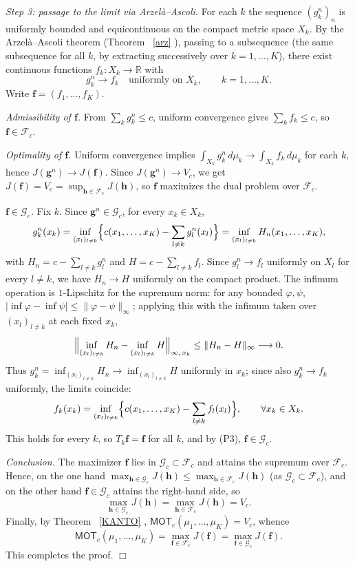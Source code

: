 \documentclass[twoside,11pt,a4paper]{article}
\newcommand*{\SavedRef}{}
\let\SavedRef\ref
\renewcommand*{\ref}[1]{  \begingroup
    \hypersetup{
      linkcolor=linkequation,
      linkbordercolor=linkequation,
    }    \SavedRef{#1}  \endgroup
}
\begin{document}
\medskip
\noindent\emph{Step 3: passage to the limit via Arzelà--Ascoli.}
For each $k$ the sequence $(g_k^n)_{n}$ is uniformly bounded and equicontinuous on
the compact metric space $X_k$. By the Arzelà--Ascoli theorem
(Theorem~\ref{arz}), passing to a subsequence (the same subsequence for all $k$,
by extracting successively over $k=1,\dots,K$), there exist continuous functions
$f_k:X_k\to\mathbb R$ with
\[
g_k^n\longrightarrow f_k\quad\text{uniformly on }X_k,\qquad k=1,\dots,K.
\]
Write $\boldsymbol f=(f_1,\dots,f_K)$.

\emph{Admissibility of $\boldsymbol f$.} From $\sum_k g_k^n\le c$, uniform
convergence gives $\sum_k f_k\le c$, so $\boldsymbol f\in\mathcal F_c$.

\emph{Optimality of $\boldsymbol f$.} Uniform convergence implies
$\int_{X_k}g_k^n\,d\mu_k\to\int_{X_k}f_k\,d\mu_k$ for each $k$, hence
$J(\boldsymbol g^n)\to J(\boldsymbol f)$. Since $J(\boldsymbol g^n)\to V_c$, we get
$J(\boldsymbol f)=V_c=\sup_{\boldsymbol h\in\mathcal F_c}J(\boldsymbol h)$, so
$\boldsymbol f$ maximizes the dual problem over $\mathcal F_c$.

\emph{$\boldsymbol f\in\mathcal G_c$.} Fix $k$. Since
$\boldsymbol g^n\in\mathcal G_c$, for every $x_k\in X_k$,
\[
g_k^n(x_k)=\inf_{(x_l)_{l\ne k}}\Bigl\{c(x_1,\dots,x_K)-\sum_{l\ne k}g_l^n(x_l)\Bigr\}
=\inf_{(x_l)_{l\ne k}}H_n(x_1,\dots,x_K),
\]
with $H_n=c-\sum_{l\ne k}g_l^n$ and $H=c-\sum_{l\ne k}f_l$. Since $g_l^n\to f_l$
uniformly on $X_l$ for every $l\ne k$, we have $H_n\to H$ uniformly on the compact
product. The infimum operation is $1$-Lipschitz for the supremum norm: for any
bounded $\varphi,\psi$,
$|\inf\varphi-\inf\psi|\le\|\varphi-\psi\|_\infty$; applying this with the infimum
taken over $(x_l)_{l\ne k}$ at each fixed $x_k$,
\[
\Bigl\|\inf_{(x_l)_{l\ne k}}H_n-\inf_{(x_l)_{l\ne k}}H\Bigr\|_{\infty,\,x_k}
\le\|H_n-H\|_\infty\longrightarrow0.
\]
Thus $g_k^n=\inf_{(x_l)_{l\ne k}}H_n\to\inf_{(x_l)_{l\ne k}}H$ uniformly in $x_k$;
since also $g_k^n\to f_k$ uniformly, the limits coincide:
\[
f_k(x_k)=\inf_{(x_l)_{l\ne k}}\Bigl\{c(x_1,\dots,x_K)-\sum_{l\ne k}f_l(x_l)\Bigr\},
\qquad\forall x_k\in X_k.
\]
This holds for every $k$, so $T_k\boldsymbol f=\boldsymbol f$ for all $k$, and by
(P3), $\boldsymbol f\in\mathcal G_c$.

\medskip
\noindent\emph{Conclusion.}
The maximizer $\boldsymbol f$ lies in $\mathcal G_c\subset\mathcal F_c$ and attains
the supremum over $\mathcal F_c$. Hence, on the one hand
$\max_{\boldsymbol h\in\mathcal G_c}J(\boldsymbol h)\le
\max_{\boldsymbol h\in\mathcal F_c}J(\boldsymbol h)$ (as $\mathcal G_c\subset\mathcal F_c$),
and on the other hand $\boldsymbol f\in\mathcal G_c$ attains the right-hand side, so
\[
\max_{\boldsymbol h\in\mathcal G_c}J(\boldsymbol h)
=\max_{\boldsymbol h\in\mathcal F_c}J(\boldsymbol h)=V_c.
\]
Finally, by Theorem~\ref{KANTO}, $\mathsf{MOT}_c(\mu_1,\dots,\mu_K)=V_c$, whence
\[
\mathsf{MOT}_c(\mu_1,\dots,\mu_K)
=\max_{\boldsymbol f\in\mathcal F_c}J(\boldsymbol f)
=\max_{\boldsymbol f\in\mathcal G_c}J(\boldsymbol f).
\]
This completes the proof.
\hfill\(\Box\)
\end{document}
